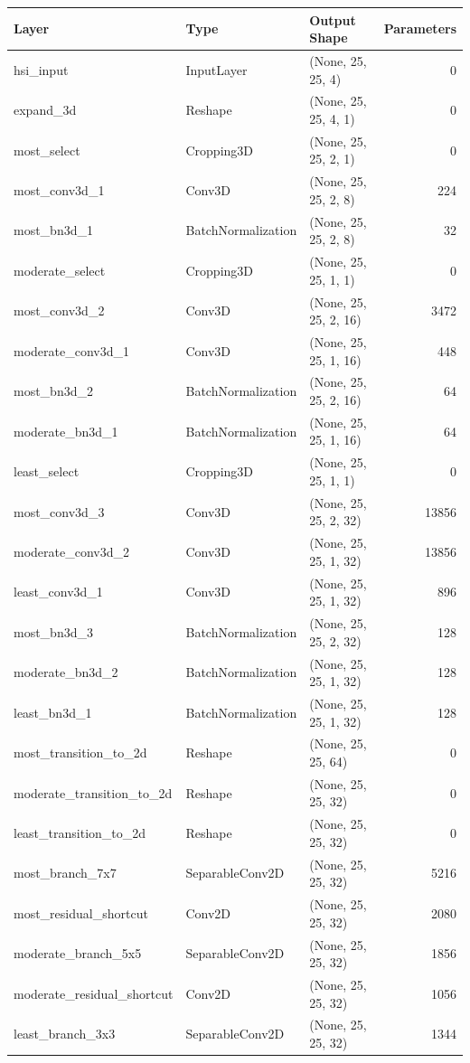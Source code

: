 \begin{tabular}{lllr}
\toprule
Layer & Type & Output Shape & Parameters \\
\midrule
hsi_input & InputLayer & (None, 25, 25, 4) & 0 \\
expand_3d & Reshape & (None, 25, 25, 4, 1) & 0 \\
most_select & Cropping3D & (None, 25, 25, 2, 1) & 0 \\
most_conv3d_1 & Conv3D & (None, 25, 25, 2, 8) & 224 \\
most_bn3d_1 & BatchNormalization & (None, 25, 25, 2, 8) & 32 \\
moderate_select & Cropping3D & (None, 25, 25, 1, 1) & 0 \\
most_conv3d_2 & Conv3D & (None, 25, 25, 2, 16) & 3472 \\
moderate_conv3d_1 & Conv3D & (None, 25, 25, 1, 16) & 448 \\
most_bn3d_2 & BatchNormalization & (None, 25, 25, 2, 16) & 64 \\
moderate_bn3d_1 & BatchNormalization & (None, 25, 25, 1, 16) & 64 \\
least_select & Cropping3D & (None, 25, 25, 1, 1) & 0 \\
most_conv3d_3 & Conv3D & (None, 25, 25, 2, 32) & 13856 \\
moderate_conv3d_2 & Conv3D & (None, 25, 25, 1, 32) & 13856 \\
least_conv3d_1 & Conv3D & (None, 25, 25, 1, 32) & 896 \\
most_bn3d_3 & BatchNormalization & (None, 25, 25, 2, 32) & 128 \\
moderate_bn3d_2 & BatchNormalization & (None, 25, 25, 1, 32) & 128 \\
least_bn3d_1 & BatchNormalization & (None, 25, 25, 1, 32) & 128 \\
most_transition_to_2d & Reshape & (None, 25, 25, 64) & 0 \\
moderate_transition_to_2d & Reshape & (None, 25, 25, 32) & 0 \\
least_transition_to_2d & Reshape & (None, 25, 25, 32) & 0 \\
most_branch_7x7 & SeparableConv2D & (None, 25, 25, 32) & 5216 \\
most_residual_shortcut & Conv2D & (None, 25, 25, 32) & 2080 \\
moderate_branch_5x5 & SeparableConv2D & (None, 25, 25, 32) & 1856 \\
moderate_residual_shortcut & Conv2D & (None, 25, 25, 32) & 1056 \\
least_branch_3x3 & SeparableConv2D & (None, 25, 25, 32) & 1344 \\

\end{tabular}
